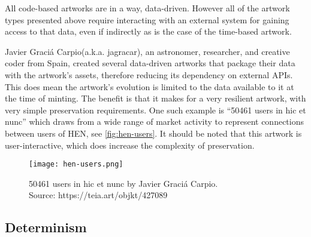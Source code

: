 All code-based artworks are in a way, data-driven. However all of the artwork types presented above require interacting with an external system for gaining access to that data, even if indirectly as is the case of the time-based artwork.

Javier Graciá Carpio\footnotemark[11] (a.k.a. jagracar), an astronomer, researcher, and creative coder from Spain, created several data-driven artworks that package their data with the artwork's assets, therefore reducing its dependency on external APIs. This does mean the artwork's evolution is limited to the data available to it at the time of minting. The benefit is that it makes for a very resilient artwork, with very simple preservation requirements. One such example is ``50461 users in hic et nunc'' which draws from a wide range of market activity to represent connections between users of HEN, see \autoref{fig:hen-users}. It should be noted that this artwork is user-interactive, which does increase the complexity of preservation.



\begin{figure}[H]
    \centering
    \captionsetup{justification=centering}
    \texttt{[image: hen-users.png]}
    \captionsetup{justification=centering}
    \caption[50461 users in hic et nunc by Javier Graciá Carpio]{50461 users in hic et nunc by Javier Graciá Carpio. \\ Source: https://teia.art/objkt/427089}
    \label{fig:hen-users}
\end{figure}


\subsection{Determinism}

